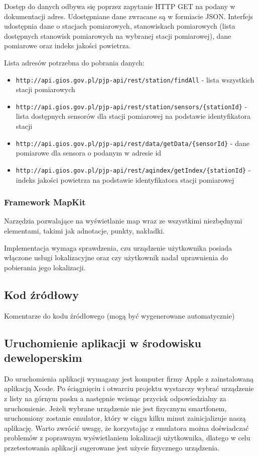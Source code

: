 \documentclass[a4paper,11pt,titlepage]{article}
\begin{document}
Dostęp do danych odbywa się poprzez zapytanie HTTP GET na podany w dokumentacji adres. Udostępniane dane zwracane są w formiacie JSON. Interfejs udostępnia dane o stacjach pomiarowych, stanowiskach pomiarowych (lista dostępnych stanowisk pomiarowych na wybranej stacji pomiarowej), dane pomiarowe oraz indeks jakości powietrza.

Lista adresów potrzebna do pobrania danych:
\begin{itemize}
 	\item \verb|http://api.gios.gov.pl/pjp-api/rest/station/findAll| - lista wszystkich stacji pomiarowych
	\item \verb|http://api.gios.gov.pl/pjp-api/rest/station/sensors/{stationId}| - lista dostępnych sensorów dla stacji pomiarowej na podstawie identyfikatora stacji
	\item \verb|http://api.gios.gov.pl/pjp-api/rest/data/getData/{sensorId}| - dane pomiarowe dla sensora o podanym w adresie id
	\item \verb|http://api.gios.gov.pl/pjp-api/rest/aqindex/getIndex/{stationId}| - indeks jakości powietrza na podstawie identyfikatora stacji pomiarowej
\end{itemize}
\subsubsection{Framework MapKit}
Narzędzia pozwalające na wyświetlanie map wraz ze wszystkimi niezbędnymi elementami, takimi jak adnotacje, punkty, nakładki.

Implementacja wymaga sprawdzenia, czu urządzenie użytkownika posiada włączone usługi lokalizacyjne oraz czy użytkownik nadał uprawnienia do pobierania jego lokalizacji.

\subsection{Kod źródłowy}
Komentarze do kodu źródłowego (mogą być wygenerowane automatycznie)


\subsection{Uruchomienie aplikacji w środowisku deweloperskim}
Do uruchomienia aplikacji wymagany jest komputer firmy Apple z zainstalowaną aplikacją Xcode. Po ściągnięciu i otwarciu projektu wystarczy wybrać urządzenie z listy na górnym pasku a następnie wcisnąc przycisk odpowiedzialny za uruchomienie. Jeżeli wybrane urządzenie nie jest fizycznym smartfonem, uruchomiony zostanie emulator, który w ciągu kilku minut zainicjalizuje naszą aplikację. Warto zwrócić uwagę, że korzystając z emulatora można doświadczać problemów z poprawnym wyświetlaniem lokalizacji użytkownika, dlatego w celu przetestowania aplikacji sugerowane jest użycie fizycznego urządzenia.
\end{document}
